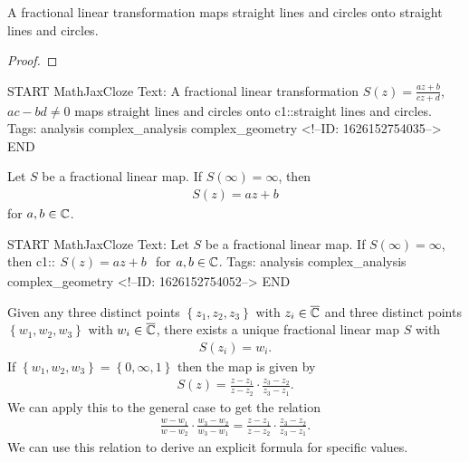 \documentclass{memoir}
\begin{document}
\begin{thm}
	A fractional linear transformation maps straight lines and circles onto straight lines and circles.
\end{thm}
\begin{proof}
	
\end{proof}

\begin{anki}
START
MathJaxCloze
Text: A fractional linear transformation \(S(z) = \frac{az+b}{c z + d}\), \(ac-bd\neq 0\) maps straight lines and circles onto {{c1::straight lines and circles}}.
Tags: analysis complex_analysis complex_geometry
<!--ID: 1626152754035-->
END
\end{anki}

\begin{lemma}
	Let \(S\) be a fractional linear map. If \(S(\infty) = \infty\), then
	\begin{align*}
		S(z) = az+b
	\end{align*}
	for \(a,b \in \mathbb{C}\).
\end{lemma}

\begin{anki}
START
MathJaxCloze
Text: Let \(S\) be a fractional linear map. If \(S(\infty) = \infty\), then
{{c1::\(\begin{align*}
        	S(z) = az+b
        \end{align*}\)
      	for \(a,b \in \mathbb{C}\)}}.
Tags: analysis complex_analysis complex_geometry
<!--ID: 1626152754052-->
END
\end{anki}


\begin{thm}
	Given any three distinct points \(\left\{ z_1,z_2,z_3 \right\} \) with \(z_i \in \overline{\mathbb{C}}\) and three distinct points \(\left\{ w_1,w_2,w_3 \right\} \) with \(w_i \in \overline{\mathbb{C}}\), there exists a unique fractional linear map \(S\) with
	\begin{align*}
		S(z_i) = w_i.
	\end{align*}
	If \(\left\{ w_1,w_2,w_3 \right\} = \left\{ 0,\infty,1 \right\} \) then the map is given by
	\begin{align*}
		S(z) = \frac{z-z_1}{z-z_2}\cdot \frac{z_3-z_2}{z_3-z_1}.
	\end{align*}
	We can apply this to the general case to get the relation
	\begin{align*}
		\frac{w-w_1}{w-w_2}\cdot \frac{w_3-w_2}{w_3-w_1} = \frac{z-z_1}{z-z_2}\cdot \frac{z_3-z_2}{z_3-z_1}.
	\end{align*}
	We can use this relation to derive an explicit formula for specific values.
\end{thm}
\end{document}
